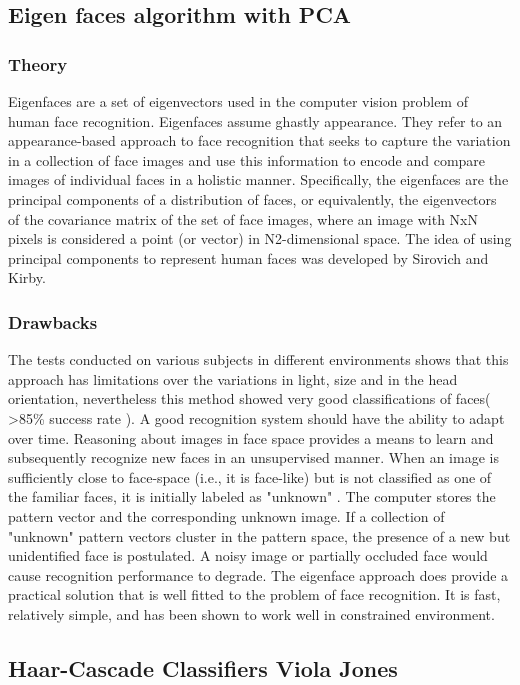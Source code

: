 \documentclass[a4paper]{article}
\begin{document}
\subsection{Eigen faces algorithm with PCA}
\subsubsection{Theory}
Eigenfaces are a set of eigenvectors used in the computer vision problem of human face recognition. Eigenfaces assume ghastly appearance. They refer to an appearance-based approach to face recognition that seeks to capture the variation in a collection of face images and use this information to encode and compare images of individual faces in a holistic manner. Specifically, the eigenfaces are the principal components of a distribution of faces, or equivalently, the eigenvectors of the covariance matrix of the set of face images, where an image with NxN pixels is considered a point (or vector) in N2-dimensional space. The idea of using principal components to represent human faces was developed by Sirovich and Kirby\cite{sirovich1987low}.
\subsubsection{Drawbacks}
The tests conducted on various subjects in different environments shows
that this approach has limitations over the variations in light, size and in
the head orientation, nevertheless this method showed very good
classifications of faces( >85\% success rate ).
A good recognition system should have the ability to adapt over time.
Reasoning about images in face space provides a means to learn and
subsequently recognize new faces in an unsupervised manner. When an
image is sufficiently close to face-space (i.e., it is face-like) but is not
classified as one of the familiar faces, it is initially labeled as "unknown" .
The computer stores the pattern vector and the corresponding unknown
image. If a collection of "unknown" pattern vectors cluster in the pattern
space, the presence of a new but unidentified face is postulated. A noisy
image or partially occluded face would cause recognition performance to
degrade. The eigenface approach does provide a practical solution that is
well fitted to the problem of face recognition. It is fast, relatively simple,
and has been shown to work well in constrained environment\cite{lata2009facial}.
\subsection{Haar-Cascade Classifiers Viola Jones}
\end{document}
